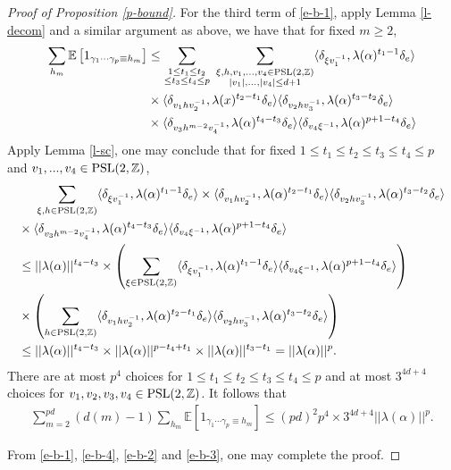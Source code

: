 \documentclass{amsart}
\theoremstyle{plain}
\theoremstyle{definition}
\theoremstyle{remark}
\begin{document}
\begin{proof}[Proof of Proposition \ref{p-bound}]
        For the third term of \eqref{e-b-1}, apply Lemma \ref{l-decom} and a similar argument as above, we have that for fixed $m\geq 2$, 
        \begin{align*}
            \sum\limits_{h_m}\mathbb{E}\left[1_{\gamma_1\cdots\gamma_p\equiv h_m}\right]&\leq\sum\limits_{\substack{1\leq t_1\leq t_2\\  \leq t_3\leq t_4\leq p}}\ \sum\limits_{\substack{\xi,h,v_1,...,v_4\in\textnormal{PSL}(2,\mathbb{Z})\\|v_1|,...,|v_4|\leq d+1}}\langle\delta_{\xi v_1^{-1}},\lambda(\alpha)^{t_1-1}\delta_e\rangle\\
          &\times \langle\delta_{v_1hv_2^{-1}},\lambda(x)^{t_2-t_1}\delta_e\rangle\langle\delta_{v_2hv_3^{-1}},\lambda(\alpha)^{t_3-t_2}\delta_e\rangle\\ &\times\langle\delta_{v_3h^{m-2}v_4^{-1}},\lambda(\alpha)^{t_4-t_3}\delta_e\rangle\langle\delta_{v_4 \xi^{-1}},\lambda(\alpha)^{p+1-t_4}\delta_e\rangle
        \end{align*}
        Apply Lemma \ref{l-sc}, one may conclude that for fixed $1\leq t_1\leq t_2\leq t_3\leq t_4\leq p$ and $v_1,...,v_4\in\textnormal{PSL}(2,\mathbb{Z})$,
        \begin{align*}
           &\ \ \ \ \sum\limits_{\xi,h\in\textnormal{PSL}(2,\mathbb{Z})} \langle\delta_{\xi v_1^{-1}},\lambda(\alpha)^{t_1-1}\delta_e\rangle\times \langle\delta_{v_1hv_2^{-1}},\lambda(\alpha)^{t_2-t_1}\delta_e\rangle\langle\delta_{v_2hv_3^{-1}},\lambda(\alpha)^{t_3-t_2}\delta_e\rangle\\ &\times\langle\delta_{v_3h^{m-2}v_4^{-1}},\lambda(\alpha)^{t_4-t_3}\delta_e\rangle\langle\delta_{v_4 \xi^{-1}},\lambda(\alpha)^{p+1-t_4}\delta_e\rangle\\
           &\leq ||\lambda(\alpha)||^{t_4-t_3}\times\left(\sum\limits_{\xi\in\textnormal{PSL}(2,\mathbb{Z})}\langle\delta_{\xi v_1^{-1}},\lambda(\alpha)^{t_1-1}\delta_e\rangle\langle\delta_{v_4 \xi^{-1}},\lambda(\alpha)^{p+1-t_4}\delta_e\rangle\right)\\
           &\times\left(\sum\limits_{h\in\textnormal{PSL}(2,\mathbb{Z})}\langle\delta_{v_1hv_2^{-1}},\lambda(\alpha)^{t_2-t_1}\delta_e\rangle\langle\delta_{v_2hv_3^{-1}},\lambda(\alpha)^{t_3-t_2}\delta_e\rangle\right)\\
           &\leq ||\lambda(\alpha)||^{t_4-t_3}\times ||\lambda(\alpha)||^{p-t_4+t_1}\times||\lambda(\alpha)||^{t_3-t_1}=||\lambda(\alpha)||^p.
        \end{align*}
        There are at most $p^4$ choices for $1\leq t_1\leq t_2\leq t_3\leq t_4\leq p$ and at most $3^{4d+4}$ choices for $v_1,v_2,v_3,v_4\in\textnormal{PSL}(2,\mathbb{Z})$. It follows that
        \begin{align}\label{e-b-3}
            \sum\limits_{m=2}^{pd}(d(m)-1)\sum\limits_{h_m}\mathbb{E}\left[1_{\gamma_1\cdots\gamma_p\equiv h_m}\right]\leq (pd)^2p^4\times 3^{4d+4}||\lambda(\alpha)||^p.
        \end{align}
        
        From \eqref{e-b-1}, \eqref{e-b-4}, \eqref{e-b-2} and \eqref{e-b-3}, one may complete the proof.
    \end{proof}
\end{document}
